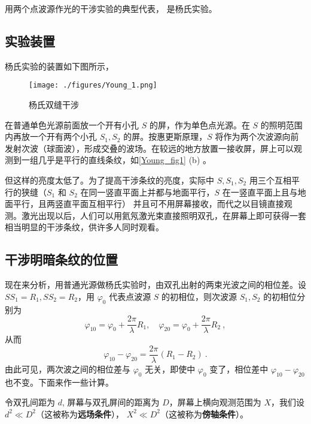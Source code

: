 

用两个点波源作光的干涉实验的典型代表， 是杨氏实验。
\subsection{实验装置}
杨氏实验的装置如下图所示，
\begin{figure}[ht]
\centering
\texttt{[image: ./figures/Young\_1.png]}
\caption{杨氏双缝干涉} \label{Young_fig1}
\end{figure}
在普通单色光源前面放一个开有小孔 $S$ 的屏，作为单色点光源。在 $S $ 的照明范围内再放一个开有两个小孔 $S_1,S_2$ 的屏。按惠更斯原理，$S$ 将作为两个次波源向前发射次波（球面波），形成交叠的波场。在较远的地方放置一接收屏，屏上可以观测到一组几乎是平行的直线条纹，如\autoref{Young_fig1} (b) 。

但这样的亮度太低了。为了提高干涉条纹的亮度，实际中 $S,S_1,S_2$ 用三个互相平行的狭缝（$S_1$ 和 $S_2$ 在同一竖直平面上并都与地面平行，$S$ 在一竖直平面上且与地面平行，且两竖直平面互相平行）
并且可不用屏幕接收，而代之以目镜直接观测。激光出现以后，人们可以用氦氖激光束直接照明双孔，在屏幕上即可获得一套相当明显的干涉条纹，供许多人同时观看。

\subsection{干涉明暗条纹的位置}
现在来分析，用普通光源做杨氏实验时，由双孔出射的两束光波之间的相位差。设 $SS_1=R_1,SS_2=R_2$，用 $\varphi_0$ 代表点波源 $S$ 的初相位，则次波源 $S_1,S_2$ 的初相位分别为
\begin{equation}
\varphi_{10}=\varphi_{0}+\frac{2 \pi}{\lambda} R_{1}, \quad \varphi_{20}=\varphi_{0}+\frac{2 \pi}{\lambda} R_{2}~,
\end{equation}
从而
\begin{equation}
\varphi_{10}-\varphi_{20}=\frac{2 \pi}{\lambda}\left(R_{1}-R_{2}\right)~.
\end{equation}
由此可见，两次波之间的相位差与 $\varphi_0$ 无关，即使中 $\varphi_0$ 变了，相位差中 $\varphi_{10}-\varphi_{20}$ 也不变。下面来作一些计算。

令双孔间距为 $d$, 屏幕与双孔屏间的距离为 $D$，屏幕上横向观测范围为 $X$，我们设 $d^{2} \ll D^{2}$（这被称为\textbf{远场条件}）， $X^{2} \ll D^{2}$（这被称为\textbf{傍轴条件}）。

